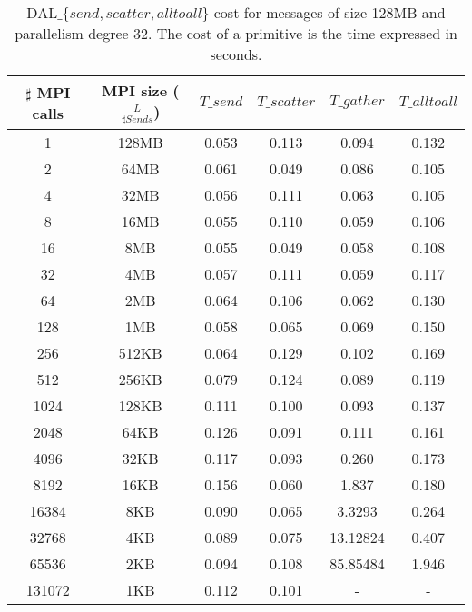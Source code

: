 \begin{table}[h]
\begin{center}
\begin{tabular}{|c|c|c|c|c|c|}\hline
\hline
$\sharp$ MPI calls & MPI size ($\frac{L}{\sharp Sends}$)  & $T\_send$   & $T\_scatter$ & $T\_gather$ &  $T\_alltoall$      \\\hline\hline
1 & 128MB & 0.053 & 0.113 & 0.094 & 0.132 \\\hline
2 & 64MB & 0.061 & 0.049 & 0.086 & 0.105 \\\hline
4 & 32MB & 0.056 & 0.111 & 0.063 & 0.105 \\\hline
8 & 16MB & 0.055 & 0.110 & 0.059 & 0.106 \\\hline
16 & 8MB & 0.055 & 0.049 & 0.058 & 0.108 \\\hline
32 & 4MB & 0.057 & 0.111 & 0.059 & 0.117 \\\hline
64 & 2MB & 0.064 & 0.106 & 0.062 & 0.130 \\\hline
128 & 1MB & 0.058 & 0.065 & 0.069 & 0.150 \\\hline
256 & 512KB & 0.064 & 0.129 & 0.102 & 0.169 \\\hline
512 & 256KB & 0.079 & 0.124 & 0.089 & 0.119 \\\hline
1024 & 128KB & 0.111 & 0.100 & 0.093 & 0.137 \\\hline
2048 & 64KB & 0.126 & 0.091 & 0.111 & 0.161 \\\hline
4096 & 32KB & 0.117 & 0.093 & 0.260 & 0.173 \\\hline
8192 & 16KB & 0.156 & 0.060 & 1.837 & 0.180 \\\hline
16384 & 8KB & 0.090 & 0.065 & 3.3293 & 0.264 \\\hline
32768 & 4KB & 0.089 & 0.075 & 13.12824 & 0.407 \\\hline
65536 & 2KB & 0.094 & 0.108 & 85.85484 & 1.946 \\\hline
131072 & 1KB & 0.112 & 0.101 & - & - \\\hline
\end{tabular}
\caption{DAL$\_\lbrace send, scatter, alltoall \rbrace$ cost for messages of size 128MB and parallelism degree 32. The cost of a primitive is the time expressed in seconds.}
\label{tsetup-pcm-n32-M128}
\end{center}
\end{table}